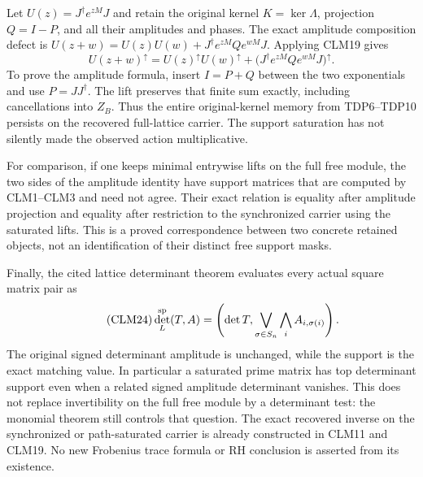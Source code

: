 \documentclass[11pt]{article}
\begin{document}
Let $U(z)=J^\dagger e^{zM}J$ and retain the original kernel
$K=\ker\Lambda$, projection $Q=I-P$, and all their amplitudes and
phases. The exact amplitude composition defect is
$U(z+w)=U(z)U(w)+J^\dagger e^{zM}Qe^{wM}J$. Applying CLM19 gives
\begin{equation}\tag{CLM23}
U(z+w)^\uparrow
 =U(z)^\uparrow U(w)^\uparrow
  +\bigl(J^\dagger e^{zM}Qe^{wM}J\bigr)^\uparrow.
\end{equation}
To prove the amplitude formula, insert $I=P+Q$ between the two
exponentials and use $P=JJ^\dagger$. The lift preserves that finite
sum exactly, including cancellations into $Z_B$. Thus the entire
original-kernel memory from TDP6--TDP10 persists on the recovered
full-lattice carrier. The support saturation has not silently made
the observed action multiplicative.

For comparison, if one keeps minimal entrywise lifts on the full free
module, the two sides of the amplitude identity have support matrices
that are computed by CLM1--CLM3 and need not agree. Their exact
relation is equality after amplitude projection and equality after
restriction to the synchronized carrier using the saturated lifts.
This is a proved correspondence between two concrete retained objects,
not an identification of their distinct free support masks.

Finally, the cited lattice determinant theorem evaluates every actual
square matrix pair as
\begin{equation}\tag{CLM24}
\det_L^{\rm sp}(T,A)
 =\left(\det T,
  \bigvee_{\sigma\in S_n}\bigwedge_i A_{i,\sigma(i)}\right).
\end{equation}
The original signed determinant amplitude is unchanged, while the
support is the exact matching value. In particular a saturated
prime matrix has top determinant support even when a related signed
amplitude determinant vanishes. This does not replace invertibility
on the full free module by a determinant test: the monomial theorem
still controls that question. The exact recovered inverse on the
synchronized or path-saturated carrier is already constructed in
CLM11 and CLM19. No new Frobenius trace formula or RH conclusion is
asserted from its existence.
\end{document}

